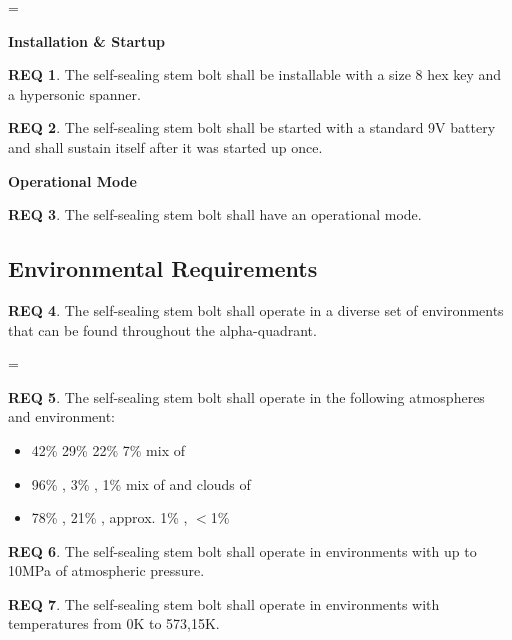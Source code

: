 \documentclass[a4paper,12pt]{article}
\theoremstyle{definition}
\newtheorem{theorem}{REQ}
\newenvironment{subtheorems}{%
  \savedtheorem=\value{theorem}%
  \edef\prevthetheorem{\thetheorem}%
  \setcounter{theorem}{0}%
  \renewcommand\thetheorem{\prevthetheorem.\arabic{theorem}}%
}
{%
  \setcounter{theorem}{\savedtheorem}%
}
\begin{document}
\begin{subtheorems}

	\noindent\textbf{\large{Installation \& Startup}}

	\begin{theorem}
		The self-sealing stem bolt shall be installable with a size 8 hex key and a hypersonic spanner.
	\end{theorem}

	\begin{theorem}
		The self-sealing stem bolt shall be started with a standard 9V battery and shall sustain itself after it was started up once.
	\end{theorem}

	\noindent\textbf{\large{Operational Mode}}
	\begin{theorem}
		The self-sealing stem bolt shall have an operational mode.
	\end{theorem}


\end{subtheorems}

\subsection{Environmental Requirements}

\begin{theorem}
	The self-sealing stem bolt shall operate in a diverse set of environments that can be found throughout the alpha-quadrant.
\end{theorem}
\begin{subtheorems}
	\begin{theorem}
		The self-sealing stem bolt shall operate in the following atmospheres and environment:
		\begin{itemize}
			\item 42\%  29\%  22\%  7\% mix of 
			\item 96\% , 3\% , 1\% mix of  and clouds of \textbf{}
			\item 78\% , 21\% , approx. 1\% , $<$1\% 
		\end{itemize}
	\end{theorem}

	\begin{theorem}
		The self-sealing stem bolt shall operate in environments with up to 10MPa of atmospheric pressure.
	\end{theorem}
	\begin{theorem}
		The self-sealing stem bolt shall operate in environments with temperatures from 0\textdegree K to 573,15\textdegree K.
	\end{theorem}
\end{subtheorems}
\end{document}

